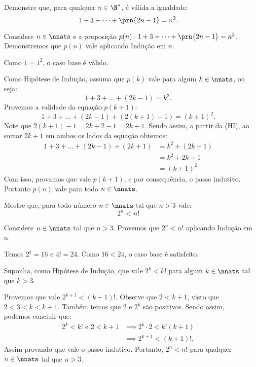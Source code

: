 \begin{example}
Demonstre que, para qualquer $n \in \N^*$, é válida a igualdade:
$$1+3+\dots +\prn {2n-1} = n^2.$$
\end{example}

\begin{solution}
Considere $n \in \nnats$ e a proposição $p(n) : 1+3+\dots +\prn {2n-1} = n^2$. Demonstremos que $p(n)$ vale aplicando Indução em $n$.

Como $1=1^2$, o caso base é válido.

Como Hipótese de Indução, assuma que $p(k)$ vale para algum $k\in \nnats$, ou seja:
$$1+3+\dots+(2k-1) = k^2.$$
Provemos a validade da equação $p(k+1)$:
$$1+3+\dots+(2k-1)+(2(k+1)-1) = (k+1)^2.$$
Note que $2(k+1)-1 = 2k + 2 - 1 = 2k +1$.
Sendo assim, a partir da (HI), ao somar $2k + 1$ em ambos os lados da equação obtemos:
\begin{align*}
1+3+\dots+(2k-1) + (2k + 1) &= k^2  + (2k + 1) \\
& = k^2 + 2k + 1 \\
& = (k + 1)^2
\end{align*}
Com isso, provamos que vale $p(k+1)$, e por consequência, o passo indutivo.
Portanto $p(n)$ vale para todo $n \in \nnats$.
\end{solution}

\begin{example}
Mostre que, para todo número $n \in \nnats$ tal que $n>3$ vale:
$$2^n < n!$$
\end{example}

\begin{solution}
Considere $n \in \nnats$ tal que $n >3$. Provemos que $2^n < n!$ aplicando Indução em $n$.

 Temos $2^4 = 16$ e $4! = 24$. Como $16 < 24$, o caso base é satisfeito.

Suponha, como Hipótese de Indução, que vale $2^k < k!$ para algum $k \in \nnats$ tal que $k > 3$.

Provemos que vale $2^{k+1} < (k+1)!$.
Observe que $2 < k + 1$, visto que $2 < 3 < k < k + 1$. Também temos que $2$ e $2^k$ são positivos. Sendo assim, podemos concluir que:
\begin{align*}
2^k < k! \text{ e } 2 < k+1 & \implies 2^k \cdot 2 < k!(k+1) \\
& \implies 2^{k+1} < (k+1)!.
\end{align*}
Assim provando que vale o passo indutivo.
Portanto, $2^n < n!$ para qualquer $n \in \nnats$ tal que $n>3$.
\end{solution}

